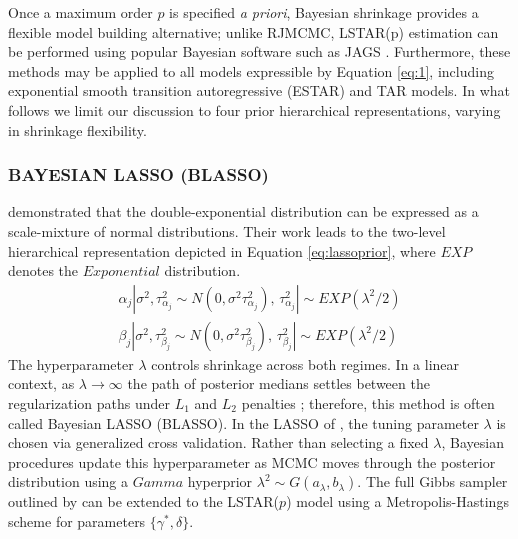 Once a maximum order $p$ is specified \textit{a priori}, Bayesian shrinkage provides a flexible model building alternative; unlike RJMCMC, LSTAR(p) estimation can be performed using popular Bayesian software such as JAGS \citep{Plummer2003}. Furthermore, these methods may be applied to all models expressible by Equation \ref{eq:1}, including exponential smooth transition autoregressive (ESTAR) and TAR models. In what follows we limit our discussion to four prior hierarchical representations, varying in shrinkage flexibility.

\subsubsection{BAYESIAN LASSO (BLASSO)}
\cite{Andrews1974} demonstrated that the double-exponential distribution can be expressed as a scale-mixture of normal distributions. Their work leads to the two-level hierarchical representation depicted in Equation \ref{eq:lassoprior}, where $EXP$ denotes the $Exponential$ distribution.
\begin{equation}
	\label{eq:lassoprior}
	\begin{split}
	\alpha_j|\sigma^2,\tau^2_{\alpha_j} \sim N(0,\sigma^2\tau^2_{\alpha_j}) \textrm{,  }  \tau^2_{\alpha_j}| \sim EXP(\lambda^2/2)\\ 
	 \beta_j|\sigma^2,\tau^2_{\beta_j}\sim N(0,\sigma^2\tau^2_{\beta_j}) \textrm{,  } \tau^2_{\beta_j}| \sim EXP(\lambda^2/2)
	\end{split}
\end{equation}
The hyperparameter $\lambda$ controls shrinkage across both regimes. In a linear context, as $\lambda \to \infty$ the path of  posterior medians settles between the regularization paths under $L_1$ and $L_2$ penalties \citep{Park2008}; therefore, this method is often called Bayesian LASSO (BLASSO). In the LASSO of \cite{Tibshirani1996}, the tuning parameter $\lambda$ is chosen via generalized cross validation. Rather than selecting a fixed $\lambda$, Bayesian procedures update this hyperparameter as MCMC moves through the posterior distribution
\citep{George2000,Casella2001,Yuan2005} using a $Gamma$ hyperprior $\lambda^2 \sim G(a_\lambda,b_\lambda)$. The full Gibbs sampler outlined by \cite{Park2008} can be extended to the LSTAR($p$) model using a  Metropolis-Hastings scheme for parameters $\{\gamma^*, \delta\}$.

